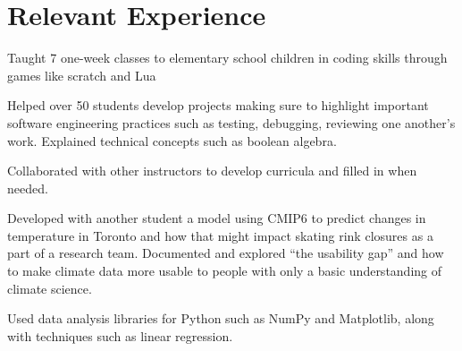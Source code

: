 \documentclass[letterpaper,10pt]{article}
\begin{document}
    \section{Relevant Experience}
    \begin{resume_list}
        \item Taught 7 one-week classes to elementary school children in coding skills through games like scratch and Lua
        \item Helped over 50 students develop projects making sure to highlight important software engineering practices
        such as testing, debugging, reviewing one another's work. Explained technical concepts such as boolean algebra. 
        \item Collaborated with other instructors to develop curricula and filled in when needed.
    \end{resume_list}

    \begin{resume_list}
        \item Developed with another student a model using CMIP6 to predict changes in temperature in Toronto and how that might impact
        skating rink closures as a part of a research team. Documented and explored ``the usability gap'' and how to make climate data more usable to people with only a basic understanding of climate science.
        \item Used data analysis libraries for Python such as NumPy and Matplotlib, along with techniques such as linear regression.
    \end{resume_list}
\end{document}
